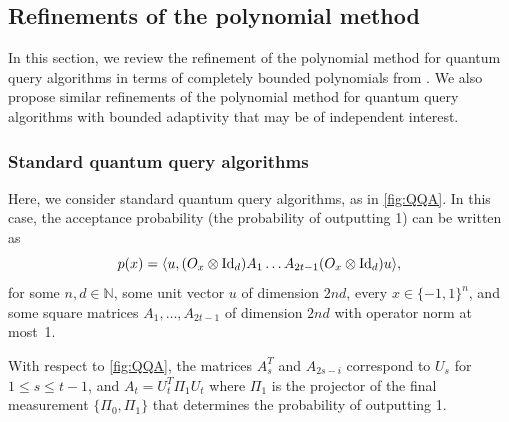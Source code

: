 \documentclass[11pt]{article}
\newcommand{\1}{\mathbf{1}}
\newcommand{\Id}{\ensuremath{\mathop{\rm Id}\nolimits}}
\theoremstyle{plain}
\theoremstyle{definition}
\theoremstyle{remark}
\begin{document}
\subsection{Refinements of the polynomial method}
In this section, we review the refinement of the polynomial method for quantum query algorithms in terms of completely bounded polynomials from \cite{QQA=CBF}. We also propose similar refinements of the polynomial method for quantum query algorithms with bounded adaptivity that may be of independent interest.

\subsubsection{Standard quantum query algorithms} Here, we consider standard quantum query algorithms, as in \cref{fig:QQA}. In this case, the acceptance probability (the probability of outputting 1) can be written as 
\begin{equation}\label{eq:QQA}
    p(x)=\langle u, (O_x\otimes \Id_d)A_{1}\dots A_{2t-1} (O_x\otimes \Id_d) u\rangle,
\end{equation}
for some $n,d\in\mathbb N$, some unit vector $u$ of dimension $2nd$,  every $x \in \{-1,1\}^n$, and some square matrices  $A_1,\dots, A_{2t-1}$ of dimension $2nd$ with operator norm at most~1.

With respect to \cref{fig:QQA}, the matrices $A_s^T$ and $A_{2s-i}$ correspond to $U_s$ for $1\leq s\leq t-1$, and $A_t=U_t^T\Pi_1U_t$ where $\Pi_1$ is the projector of the final measurement $\{\Pi_0,\Pi_1\}$ that determines the probability of outputting 1. 
\end{document}
